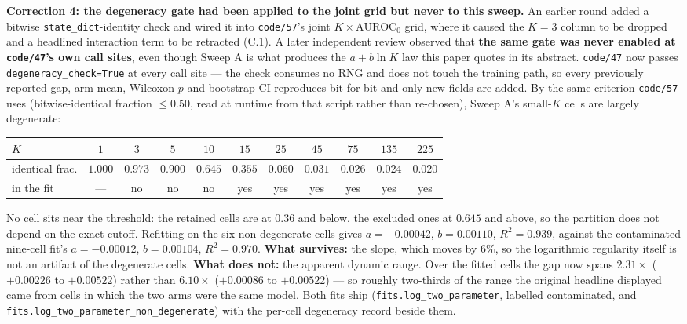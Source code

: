 \documentclass[10pt]{article} %
\begin{document}
\textbf{Correction 4: the degeneracy gate had been applied to the joint grid
but never to this sweep.} An earlier round added a bitwise
\texttt{state\_dict}-identity check and wired it into \texttt{code/57}'s joint
$K\times\text{AUROC}_0$ grid, where it caused the $K=3$ column to be dropped and
a headlined interaction term to be retracted (C.1). A later independent review
observed that \textbf{the same gate was never enabled at \texttt{code/47}'s own
call sites}, even though Sweep A is what produces the $a+b\ln K$ law this paper
quotes in its abstract. \texttt{code/47} now passes
\texttt{degeneracy\_check=True} at every call site --- the check consumes no
RNG and does not touch the training path, so every previously reported gap, arm
mean, Wilcoxon $p$ and bootstrap CI reproduces bit for bit and only new fields
are added. By the same criterion \texttt{code/57} uses (bitwise-identical
fraction $\leq0.50$, read at runtime from that script rather than re-chosen),
Sweep A's small-$K$ cells are largely degenerate:

\begin{center}\small
\begin{tabular}{lcccccccccc}
\toprule
$K$ & $1$ & $3$ & $5$ & $10$ & $15$ & $25$ & $45$ & $75$ & $135$ & $225$ \\
\midrule
identical frac. & $1.000$ & $0.973$ & $0.900$ & $0.645$ & $0.355$ & $0.060$ &
$0.031$ & $0.026$ & $0.024$ & $0.020$ \\
in the fit & --- & no & no & no & yes & yes & yes & yes & yes & yes \\
\bottomrule
\end{tabular}
\end{center}

\noindent No cell sits near the threshold: the retained cells are at $0.36$ and
below, the excluded ones at $0.645$ and above, so the partition does not depend
on the exact cutoff. Refitting on the six non-degenerate cells gives
$a=-0.00042$, $b=0.00110$, $R^2=\mathbf{0.939}$, against the contaminated
nine-cell fit's $a=-0.00012$, $b=0.00104$, $R^2=0.970$. \textbf{What survives:}
the slope, which moves by $6\%$, so the logarithmic regularity itself is not an
artifact of the degenerate cells. \textbf{What does not:} the apparent dynamic
range. Over the fitted cells the gap now spans $2.31\times$ ($+0.00226$ to
$+0.00522$) rather than $6.10\times$ ($+0.00086$ to $+0.00522$) --- so roughly
two-thirds of the range the original headline displayed came from cells in
which the two arms were the same model. Both fits ship
(\texttt{fits.log\_two\_parameter}, labelled contaminated, and
\texttt{fits.log\_two\_parameter\_non\_degenerate}) with the per-cell
degeneracy record beside them.
\end{document}
